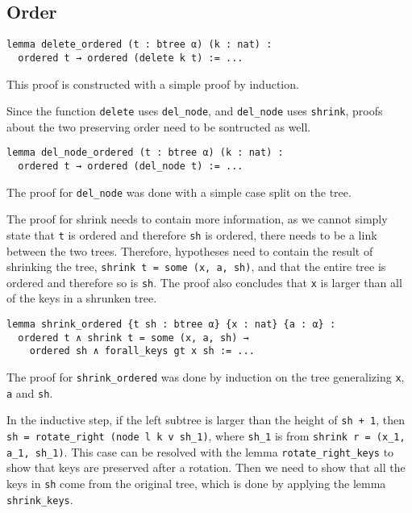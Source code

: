 \subsection*{Order}
\begin{lstlisting}
lemma delete_ordered (t : btree α) (k : nat) :
  ordered t → ordered (delete k t) := ...
\end{lstlisting}

This proof is constructed with a simple proof by induction. 

Since the function \lstinline{delete} uses \lstinline{del_node}, and \lstinline{del_node} uses \lstinline{shrink}, proofs about the two preserving order need to be sontructed as well.

\begin{lstlisting}
lemma del_node_ordered (t : btree α) (k : nat) :
  ordered t → ordered (del_node t) := ...
\end{lstlisting}

The proof for \lstinline{del_node} was done with a simple case split on the tree.

The proof for shrink needs to contain more information, as we cannot simply state that \lstinline{t} is ordered and therefore \lstinline{sh} is ordered, there needs to be a link between the two trees. Therefore, hypotheses need to contain the result of shrinking the tree, \lstinline{shrink t = some (x, a, sh)}, and that the entire tree is ordered and therefore so is \lstinline{sh}. The proof also concludes that \lstinline{x} is larger than all of the keys in a shrunken tree.

\begin{lstlisting}
lemma shrink_ordered {t sh : btree α} {x : nat} {a : α} :
  ordered t ∧ shrink t = some (x, a, sh) →
    ordered sh ∧ forall_keys gt x sh := ...
\end{lstlisting}

The proof for \lstinline{shrink_ordered} was done by induction on the tree generalizing \lstinline{x}, \lstinline{a} and \lstinline{sh}.

In the inductive step, if the left subtree is larger than the height of \lstinline{sh + 1}, then \lstinline{sh = rotate_right (node l k v sh_1)}, where \lstinline{sh_1} is from \lstinline{shrink r = (x_1, a_1, sh_1)}. This case can be resolved with the lemma \lstinline{rotate_right_keys} to show that keys are preserved after a rotation. Then we need to show that all the keys in \lstinline{sh} come from the original tree, which is done by applying the lemma \lstinline{shrink_keys}.

